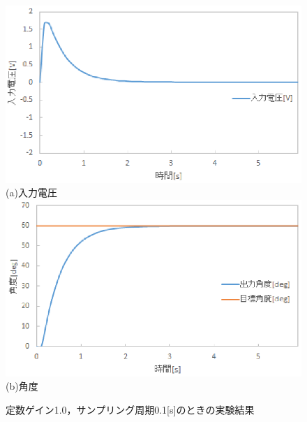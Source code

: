 \documentclass[11pt,a4paper]{jsarticle}
\begin{document}
\begin{figure}[H]
 \begin{center}
  \includegraphics[scale=.6]{./picture/graph3.eps} \\
  (a)入力電圧 \\
  \includegraphics[scale=.6]{./picture/graph4.eps} \\
  (b)角度
  \caption{定数ゲイン1.0，サンプリング周期0.1[s]のときの実験結果}
  \label{fig4}
 \end{center}
\end{figure}
\end{document}
